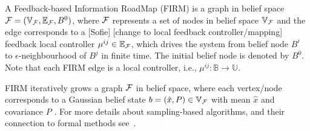\documentclass[conference]{IEEEtran}
\newcommand{\sofie}[1]{{\color{purple} [Sofie] #1}}
\begin{document}
\begin{definition}[FIRM]
A Feedback-based Information RoadMap (FIRM) is a graph in belief space $\mathcal{F} = (\mathbb{V}_{\mathcal{F}}, \mathbb{E}_{\mathcal{F}}, B^0)$, where $\mathcal{F}$ represents a set of nodes in belief space $\mathbb{V}_{\mathcal{F}}$ and the edge corresponds to a \sofie{[change to local feedback controller/mapping]} feedback local controller $\mu^{ij} \in \mathbb{E}_{\mathcal{F}}$, which drives the system from belief node $B^i$ to $\epsilon$-neighbourhood of $B^j$ in finite time. The initial belief node is denoted by $B^0$. Note that each FIRM edge is a local controller, i.e., $\mu^{ij}:\mathbb{B}\rightarrow\mathbb{U}$.
\end{definition}

FIRM iteratively grows a graph $\mathcal{F}$ in belief space, where each vertex/node corresponds to a Gaussian belief state $b = (\hat{x},P) \in \mathbb{V}_{\mathcal{F}}$ with mean $\hat{x}$ and covariance $P$ \cite{Agha14}. For more details about sampling-based algorithms, and their connection to formal methods see~\cite{Lav06,KF-IJRR11,VaBe-IROS-2013}. %




\end{document}
